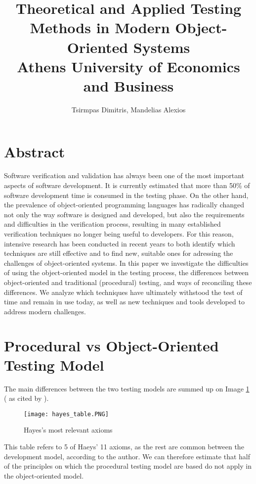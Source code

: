 \documentclass[12pt]{article}
\title{Theoretical and Applied Testing Methods in Modern Object-Oriented Systems\\\large Athens University of Economics and Business}
\author{Tsirmpas Dimitris, Mandelias Alexios}
\begin{document}
\begin{titlepage}
\maketitle
\end{titlepage}

\tableofcontents
\newpage

\section{Abstract}

Software verification and validation has always been one of the most important aspects of software development. It is currently estimated that more than 50\% of software development time is consumed in the testing phase. On the other hand, the prevalence of object-oriented programming languages has radically changed not only the way software is designed and developed, but also the requirements and difficulties in the verification process, resulting in many established verification techniques no longer being useful to developers. For this reason, intensive research has been conducted in recent years to both identify which techniques are still effective and to find new, suitable ones for adressing the challenges of object-oriented systems. In this paper we investigate the difficulties of using the object-oriented model in the testing process, the differences between object-oriented and traditional (procedural) testing, and ways of reconciling these differences. We analyze which techniques have ultimately withstood the test of time and remain in use today, as well as new techniques and tools developed to address modern challenges.


\section{Procedural vs Object-Oriented Testing Model}

The main differences between the two testing models are summed up on Image \ref{fig:hayes_table} (\textcite{hayes} as cited by \textcite{gordon}).

\begin{figure}
\label{fig:hayes_table}
\caption{Hayes's most relevant axioms}
\texttt{[image: hayes\_table.PNG]}
\end{figure}

\par This table refers to 5 of Haeys' 11 axioms, as the rest are common between the development model, according to the author. We can therefore estimate that half of the principles on which the procedural testing model are based do not apply in the object-oriented model.
\end{document}
